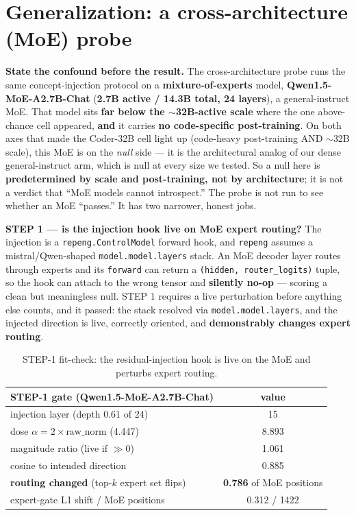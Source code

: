 \documentclass[11pt]{article}
\begin{document}
\section{Generalization: a cross-architecture (MoE) probe}
\label{sec:moe}

\textbf{State the confound before the result.} The cross-architecture probe runs the same concept-injection protocol on a \textbf{mixture-of-experts} model, \textbf{Qwen1.5-MoE-A2.7B-Chat} (\textbf{2.7B active / 14.3B total, 24 layers}), a general-instruct MoE. That model sits \textbf{far below the $\sim$32B-active scale} where the one above-chance cell appeared, \textbf{and} it carries \textbf{no code-specific post-training}. On both axes that made the Coder-32B cell light up (code-heavy post-training AND $\sim$32B scale), this MoE is on the \emph{null} side --- it is the architectural analog of our dense general-instruct arm, which is null at every size we tested. So a null here is \textbf{predetermined by scale and post-training, not by architecture}; it is not a verdict that ``MoE models cannot introspect.'' The probe is not run to see whether an MoE ``passes.'' It has two narrower, honest jobs.

\textbf{STEP 1 --- is the injection hook live on MoE expert routing?} The injection is a \texttt{repeng.ControlModel} forward hook, and \texttt{repeng} assumes a mistral/Qwen-shaped \texttt{model.model.layers} stack. An MoE decoder layer routes through experts and its \texttt{forward} can return a \texttt{(hidden, router\_logits)} tuple, so the hook can attach to the wrong tensor and \textbf{silently no-op} --- scoring a clean but meaningless null. STEP 1 requires a live perturbation before anything else counts, and it passed: the stack resolved via \texttt{model.model.layers}, and the injected direction is live, correctly oriented, and \textbf{demonstrably changes expert routing}.

\begin{table}[htbp]
\centering
\begin{tabular}{lc}
\toprule
STEP-1 gate (Qwen1.5-MoE-A2.7B-Chat) & value \\
\midrule
injection layer (depth 0.61 of 24)              & 15 \\
dose $\alpha = 2 \times \text{raw\_norm}$ (4.447) & 8.893 \\
magnitude ratio (live if $\gg 0$)               & 1.061 \\
cosine to intended direction                    & 0.885 \\
\textbf{routing changed} (top-$k$ expert set flips) & \textbf{0.786} of MoE positions \\
expert-gate L1 shift / MoE positions            & 0.312 / 1422 \\
\bottomrule
\end{tabular}
\caption{STEP-1 fit-check: the residual-injection hook is live on the MoE and perturbs expert routing.}
\label{tab:moe-step1}
\end{table}
\end{document}

